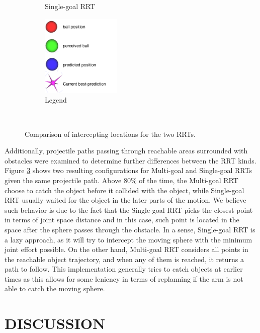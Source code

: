 \documentclass[letterpaper, 10 pt, conference]{ieeeconf}  %
\begin{document}
\begin{figure}
\begin{subfigure}[b]{0.4\textwidth}
                \caption{Single-goal RRT}
                \label{fig:vissingle}
        \end{subfigure}
        \begin{subfigure}[b]{0.4\textwidth}
                \centering
                \includegraphics[width=1.5in]{fig/legends}
                \caption{Legend}
                \label{fig:legends}
        \end{subfigure}
        ~ %
        \caption{Comparison of intercepting locations for the two RRTs.
        }\label{fig:visrrts}
\end{figure}

Additionally, projectile paths passing through reachable areas surrounded
with obstacles were examined to determine further differences between the RRT
kinds. Figure \ref{fig:visrrts} shows two resulting configurations for
Multi-goal and Single-goal RRTs given the same projectile path. Above
80\% of the time, the Multi-goal RRT choose to catch the object before it
collided with the object, while Single-goal RRT usually waited for the
object in the later parts of the motion. We believe such behavior is due
to the fact that the Single-goal RRT picks the closest point in terms of
joint space distance and in this case, such point is located in the
space after the sphere passes through the obstacle. In a sense,
Single-goal RRT is a lazy approach, as it will try to intercept the
moving sphere with the minimum joint effort possible. On the other hand,
Multi-goal RRT considers all points in the reachable object trajectory,
and when any of them is reached, it returns a path to follow. This
implementation generally tries to catch objects at earlier times as this
allows for some leniency in terms of replanning if the arm is not able to catch
the moving sphere.



\section{DISCUSSION}
\end{document}
